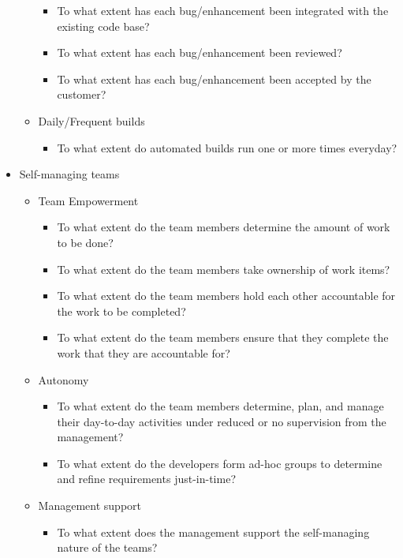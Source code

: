 \begin{appendices}
\begin{itemize}
\begin{itemize}
\begin{itemize}
					\item To what extent has each bug/enhancement been integrated with the existing code base? 
					\item To what extent has each bug/enhancement been reviewed? 
					\item To what extent has each bug/enhancement been accepted by the customer? 
				\end{itemize}
			\item Daily/Frequent builds
				\begin{itemize}
					\item To what extent do automated builds run one or more times everyday?
				\end{itemize}
		\end{itemize}

	\item Self-managing teams
		\begin{itemize}
			\item Team Empowerment
				\begin{itemize}
					\item To what extent do the team members determine the amount of work to be done? 
					\item To what extent do the team members take ownership of work items? 
					\item To what extent do the team members hold each other accountable for the work to be completed? 
					\item To what extent do the team members ensure that they complete the work that they are accountable for?
				\end{itemize}
			\item Autonomy
				\begin{itemize}
					\item To what extent do the team members determine, plan, and manage their day-to-day activities under reduced or no supervision from the management? 
					\item To what extent do the developers form ad-hoc groups to determine and refine requirements just-in-time? 
				\end{itemize}
			\item Management support
				\begin{itemize}
					\item To what extent does the management support the self-managing nature of the teams?
				\end{itemize}

\end{itemize}
\end{itemize}
\end{appendices}
